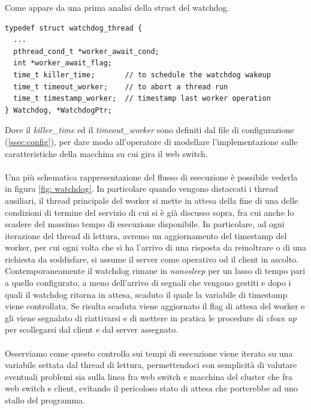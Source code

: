 \documentclass[italian]{tktltiki2}
\begin{document}
Come appare da una prima analisi della struct del watchdog.
\begin{lstlisting}
typedef struct watchdog_thread {
  ...                           
  pthread_cond_t *worker_await_cond;             
  int *worker_await_flag;
  time_t killer_time;       // to schedule the watchdog wakeup
  time_t timeout_worker;    // to abort a thread run
  time_t timestamp_worker;  // timestamp last worker operation
} Watchdog, *WatchdogPtr;
\end{lstlisting}
Dove il \emph{killer\_time} ed il \emph{timeout\_worker} sono definiti dal file di configurazione (\ref{ssec:config}), per dare modo all'operatore di modellare l'implementazione sulle caratteristiche della macchina su cui gira il web switch. \\\\
Una più schematica rappresentazione del flusso di esecuzione è possibile vederla in figura \ref{fig: watchdog}.
In particolare quando vengono distaccati i thread ausiliari, il thread principale del worker si mette in attesa della fine di una delle condizioni di termine del servizio di cui si è già discusso sopra, fra cui anche lo scadere del massimo tempo di esecuzione disponibile. In particolare, ad ogni iterazione del thread di lettura, avremo un aggiornamento del timestamp del worker, per cui ogni volta che si ha l'arrivo di una risposta da reinoltrare o di una richiesta da soddisfare, si assume il server come operativo od il client in ascolto. \\ 
Contemporaneamente il watchdog rimane in \emph{nanosleep} per un lasso di tempo pari a quello configurato, a meno dell'arrivo di segnali che vengono gestiti e dopo i quali il watchdog ritorna in attesa, scaduto il quale la variabile di timestamp viene controllata. Se risulta scaduta viene aggiornato il flag di attesa del worker e gli viene segnalato di riattivarsi e di mettere in pratica le procedure di \emph{clean up} per scollegarsi dal client e dal server assegnato. \\\\
Osserviamo come questo controllo sui tempi di esecuzione viene iterato su una variabile settata dal thread di lettura, permettendoci con semplicità di valutare eventuali problemi sia sulla linea fra web switch e macchina del cluster che fra web switch e client, evitando il pericoloso stato di attesa che porterebbe ad uno stallo del programma.

\newpage
\end{document}
